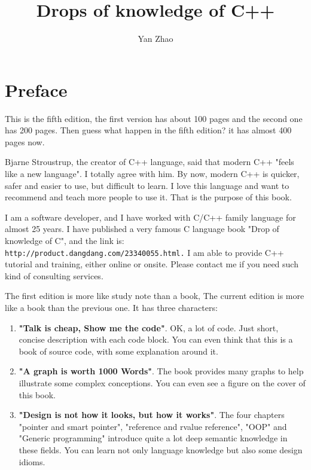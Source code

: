 \documentclass[a4paper,11pt,twoside]{book}
\begin{document}
\title{Drops of knowledge of C++}
\author{Yan Zhao}
\date{}\maketitle

\setcounter{secnumdepth}{4}
\setcounter{tocdepth}{4}
\tableofcontents

\chapter*{Preface}
This is the fifth edition, the first version has about 100 pages and the second one has 200 pages. Then guess what happen in the fifth edition? it has almost 400 pages now. \par \medskip

Bjarne Stroustrup, the creator of C++ language, said that modern C++  "feels like a new language". I totally agree with him. By now, modern C++ is quicker, safer and easier to use, but difficult to learn. I love this language and want to recommend and teach more people to use it. That is the purpose of this book.  \par \medskip

I am a software developer, and I have worked with C/C++ family language for almost 25 years. I have published a very famous C language book "Drop of knowledge of C", and the link is:\\ \verb|http://product.dangdang.com/23340055.html.| I am able to provide C++ tutorial and training, either online or onsite. Please contact me if you need such kind of consulting services.\par \par \medskip


The first edition is more like study note than a book, The current edition is more like a book than the previous one. It has three characters:
\begin{enumerate}
	\item \textbf{"Talk is cheap, Show me the code"}. OK, a lot of code. Just short, concise description with each code block. You can even think that this is a book of source code, with some explanation around it.
	
	\item \textbf{"A graph is worth 1000 Words"}. The book provides many graphs to help illustrate some complex conceptions. You can even see a figure on the cover of this book.
	
	\item \textbf{"Design is not how it looks, but how it works"}. The four chapters "pointer and smart pointer", "reference and rvalue reference", "OOP" and "Generic programming" introduce quite a lot deep semantic knowledge in these fields. You can learn not only language knowledge but also some design idioms.
\end{enumerate}
\end{document}
